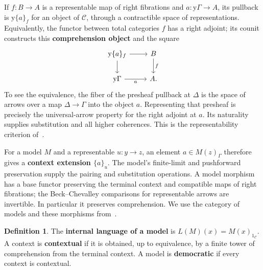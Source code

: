 \documentclass[oneside]{article}
\theoremstyle{plain}
\theoremstyle{definition}
\newtheorem{definition}[theorem]{Definition}
\theoremstyle{remark}
\newcommand{\yo}{\mathrm y}
\begin{document}
If $f:B\to A$ is a representable map of right fibrations and $a:\yo\Gamma\to A$, its pullback is $\yo\{a\}_f$ for an object of $\mathcal C$, through a contractible space of representations. Equivalently, the functor between total categories $f$ has a right adjoint; its counit constructs this \textbf{comprehension object} and the square
\[
    \begin{tikzcd}
        \yo\{a\}_f \ar[r]\ar[d] & B\ar[d,"f"]\\
        \yo\Gamma\ar[r,"a"']&A.
    \end{tikzcd}
\]
To see the equivalence, the fiber of the presheaf pullback at $\Delta$ is the space of arrows over a map $\Delta\to\Gamma$ into the object $a$. Representing that presheaf is precisely the universal-arrow property for the right adjoint at $a$. Its naturality supplies substitution and all higher coherences. This is the representability criterion of~\cite[\S3.2]{NguyenUemura2025}.

For a model $M$ and a representable $u:y\to z$, an element $a\in M(z)_\Gamma$ therefore gives a \textbf{context extension $\{a\}_u$}. The model's finite-limit and pushforward preservation supply the pairing and substitution operations. A model morphism has a base functor preserving the terminal context and compatible maps of right fibrations; the Beck--Chevalley comparisons for representable arrows are invertible. In particular it preserves comprehension. We use the category of models and these morphisms from~\cite[\S3.3]{NguyenUemura2025}.

\begin{definition}
\label{def:internal-model-democratic}
    The \textbf{internal language of a model} is $L(M)(x)=M(x)_{1_{\mathcal C}}$. A context is \textbf{contextual} if it is obtained, up to equivalence, by a finite tower of comprehension from the terminal context. A model is \textbf{democratic} if every context is contextual.
\end{definition}
\end{document}
